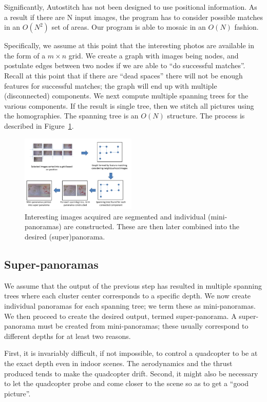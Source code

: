 \documentclass[10pt,twocolumn,letterpaper]{article}
\begin{document}
Significantly, Autostitch has not been designed to use positional
information. As a result if there are N input images, the program has
to consider possible matches in an $O(N^2)$ set of areas.  Our program
is able to mosaic in an $O(N)$ fashion.
 
Specifically, we assume at this point that the interesting photos are
available in the form of a $m \times n$ grid. We create a graph with
images being nodes, and postulate edges between two nodes if we are
able to ``do successful matches''. Recall at this point that if there
are ``dead spaces'' there will not be enough features for successful
matches; the graph will end up with multiple (disconnected)
components.  We next compute multiple spanning trees for the various
components. If the result is single tree, then we stitch all pictures
using the homographies.  The spanning tree is an $O(N)$ structure. The
process is described in Figure~\ref{fig:graph}.

\begin{figure}[h!]
  \centering
  \includegraphics[width=0.49\textwidth]{figures/graph} 
  \caption{ \label{fig:graph} Interesting images acquired are
    segmented and individual (mini-panoramas) are constructed. These
    are then later combined into the desired (super)panorama.  }
\end{figure}    


\subsection{Super-panoramas}
We assume that the output of the previous step has resulted in
multiple spanning trees where each cluster center corresponds to a
specific depth. We now create individual panoramas for each spanning
tree; we term these as mini-panoramas. We then proceed to create the
desired output, termed super-panorama.  A super-panorama must be
created from mini-panoramas; these usually correspond to different
depths for at least two reasons.

First, it is invariably difficult, if not impossible, to control a
quadcopter to be at the exact depth even in indoor scenes.  The
aerodynamics and the thrust produced tends to make the quadcopter
drift.  Second, it might also be necessary to let the quadcopter probe
and come closer to the scene so as to get a ``good picture''.
\end{document}
